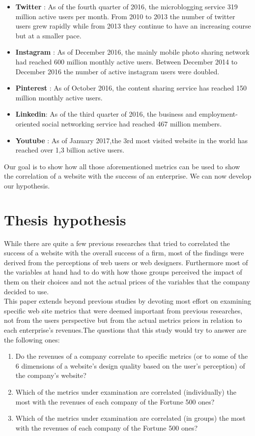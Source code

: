 \documentclass{book}
\begin{document}
\begin{itemize}
\item \textbf{Twitter} : As of the fourth quarter of 2016, the microblogging service 319 million active users per month.\cite{key28} From 2010 to 2013 the number of twitter users grew rapidly while from 2013 they continue to have an increasing course but at a smaller pace.
\item \textbf{Instagram} : As of December 2016, the mainly mobile photo sharing network had reached 600 million monthly active users.\cite{key29} Between December 2014 to December 2016 the number of active instagram users were doubled.
\item \textbf{Pinterest} : As of October 2016, the content sharing service has reached 150 million monthly active users.\cite{key47}
\item\textbf{Linkedin}: As of the third quarter of 2016, the business and employment-oriented social networking service had reached 467 million members.\cite{key31}
\item\textbf{Youtube} : As of January 2017,the 3rd most visited website in the world has reached over 1,3 billion active users.\cite{key32}
\end{itemize}
Our goal is to show how all those aforementioned metrics can be used to show the correlation of a website with the success of an enterprise. We can now develop our hypothesis. 

\section{Thesis hypothesis}
While there are quite a few previous researches that tried to correlated the success of a website with the overall success of a firm, most of the findings were derived from the perceptions of web users or web designers. Furthermore most of the variables at hand had to do with how those groups perceived the impact of them on their choices and not the actual prices of the variables that the company decided to use.\\
This paper extends beyond previous studies by devoting most effort on examining specific web site metrics that were deemed important from previous researches, not from the users perspective but from the actual metrics prices in relation to each enterprise's revenues.The questions that this study would try to answer are the following ones:
\begin{enumerate}
\item Do the revenues of a company correlate to specific metrics (or to some of the 6 dimensions of a website's design quality based on the user's perception) of the company's website?
\item Which of the metrics under examination are correlated (individually) the most with the revenues of each company of the Fortune 500 ones?
\item Which of the metrics under examination are correlated (in groups) the most with the revenues of each company of the Fortune 500 ones?
\end{enumerate}
\end{document}
